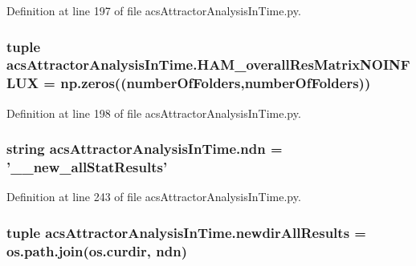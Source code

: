 Definition at line 197 of file acs\-Attractor\-Analysis\-In\-Time.\-py.

\hypertarget{a00091_a6ea74abf4c94200ed1b27d892ecacc97}{
\subsubsection[{H\-A\-M\-\_\-overall\-Res\-Matrix\-N\-O\-I\-N\-F\-L\-U\-X}]{\setlength{\rightskip}{0pt plus 5cm}tuple acs\-Attractor\-Analysis\-In\-Time.\-H\-A\-M\-\_\-overall\-Res\-Matrix\-N\-O\-I\-N\-F\-L\-U\-X = np.\-zeros(({\bf number\-Of\-Folders},{\bf number\-Of\-Folders}))}}\label{a00091_a6ea74abf4c94200ed1b27d892ecacc97}


Definition at line 198 of file acs\-Attractor\-Analysis\-In\-Time.\-py.

\hypertarget{a00091_ab0e0a55161ee1fd9fb0f086a328f67b7}{
\subsubsection[{ndn}]{\setlength{\rightskip}{0pt plus 5cm}string acs\-Attractor\-Analysis\-In\-Time.\-ndn = '\-\_\-\_\-new\-\_\-all\-Stat\-Results'}}\label{a00091_ab0e0a55161ee1fd9fb0f086a328f67b7}


Definition at line 243 of file acs\-Attractor\-Analysis\-In\-Time.\-py.

\hypertarget{a00091_aaf0f6fcbaaf97dcff16b62e86df0209c}{
\subsubsection[{newdir\-All\-Results}]{\setlength{\rightskip}{0pt plus 5cm}tuple acs\-Attractor\-Analysis\-In\-Time.\-newdir\-All\-Results = os.\-path.\-join(os.\-curdir, {\bf ndn})}}\label{a00091_aaf0f6fcbaaf97dcff16b62e86df0209c}


